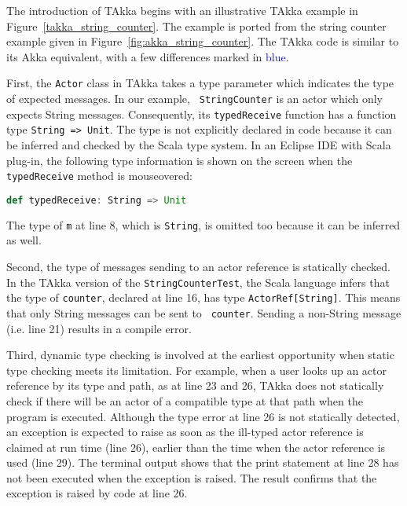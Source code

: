The introduction of TAkka begins with an illustrative TAkka example in Figure~\ref{takka_string_counter}. The example is ported from the string counter 
example given in Figure~\ref{fig:akka_string_counter}.  The TAkka code is 
similar to its Akka equivalent, with a few differences marked in 
\textcolor{blue}{blue}.  

First, the {\tt Actor} class in TAkka takes a type 
parameter which indicates the type of expected messages.  In our example, {\tt 
StringCounter} is an actor which only expects String messages.  Consequently, 
its {\tt typedReceive} function has a function type {\tt String => Unit}.  The 
type is not explicitly declared in code because it can be inferred and checked 
by the Scala type system.  In an Eclipse IDE with Scala plug-in, the following 
type information is shown on the screen when the {\tt typedReceive} 
method is mouseovered:
\begin{lstlisting}[language=scala]
  def typedReceive: String => Unit
\end{lstlisting}%
The type of {\tt m} at line 8, which is {\tt String}, is omitted too because it can be 
inferred as well.

Second, the type of messages sending to an actor reference is statically 
checked. In the TAkka version of the {\tt StringCounterTest}, the Scala 
language infers that the  type of {\tt counter}, declared at line 16, has type 
{\tt ActorRef[String]}.  This means that only String messages can be sent to {\tt 
counter}.   Sending a non-String message (i.e. line 21) results in a compile error.

Third, dynamic type checking is involved at the earliest opportunity when 
static type checking meets its limitation.  For example, when a user looks up 
an actor reference by its type and path, as at line 23 and 26, 
TAkka does not statically check if there will be an actor of a 
compatible type at that path when the program is executed.  Although the type 
error at line 26 is not statically detected, an exception is expected to raise
as soon as the ill-typed actor reference is claimed at run time (line 26), 
earlier than the time when the actor reference is used (line 29).  
The terminal output shows that the print statement
at line 28 has not been executed when the exception is raised.  The result confirms that
the exception is raised by code at line 26.



